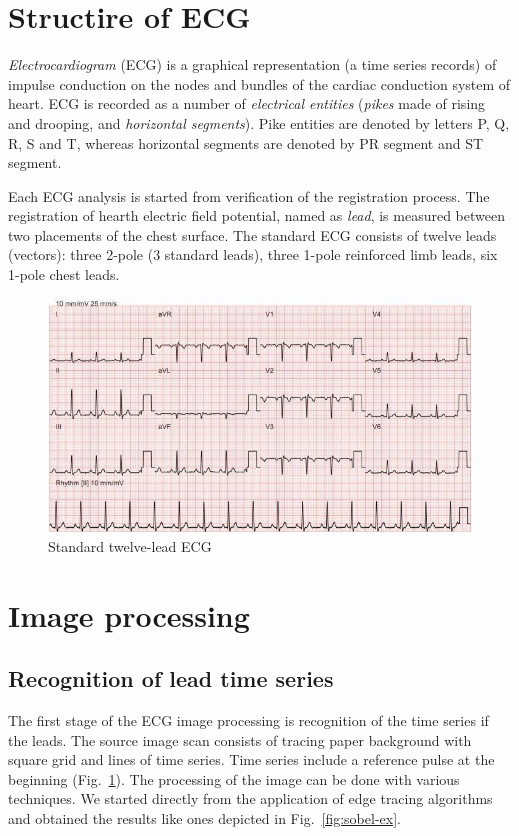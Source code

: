 \documentclass[runningheads]{AIIT}
\begin{document}
\section{Structire of ECG}
\label{sec:structire-ecg}

\emph{Electrocardiogram} (ECG) is a graphical representation (a time series records) of impulse conduction on the nodes and bundles of the cardiac conduction system of heart.  ECG is recorded as a number of \emph{electrical entities} \cite{wikipedia} (\emph{pikes} made of rising and drooping, and \emph{horizontal segments}).  Pike entities are denoted by letters P, Q, R, S and T, whereas horizontal segments are denoted by PR segment and ST segment.

Each ECG analysis is started from verification of the registration process.  The registration of hearth electric field potential, named as \emph{lead}, is measured between two placements of the chest surface.  The standard ECG consists of twelve leads (vectors): three 2-pole (3 standard leads), three 1-pole reinforced limb leads, six 1-pole chest leads.

\begin{figure}[htb]
  \centering
    \includegraphics[width=0.5\linewidth]{images/Stand_ECG.jpg}
  \caption{Standard twelve-lead ECG}
  \label{fig:leads-ex}
\end{figure}

\section{Image processing}
\label{sec:image-processing}

\subsection{Recognition of lead time series}
\label{sec:digit-recogn}

The first stage of the ECG image processing is recognition of the time series if the leads.  The source image scan consists of tracing paper background with square grid and lines of time series.  Time series include a reference pulse at the beginning (Fig.~\ref{fig:leads-ex}).  The processing of the image can be done with various techniques.  We started directly from the application of edge tracing algorithms and obtained the results like ones depicted in Fig.~\ref{fig:sobel-ex}.
\end{document}
